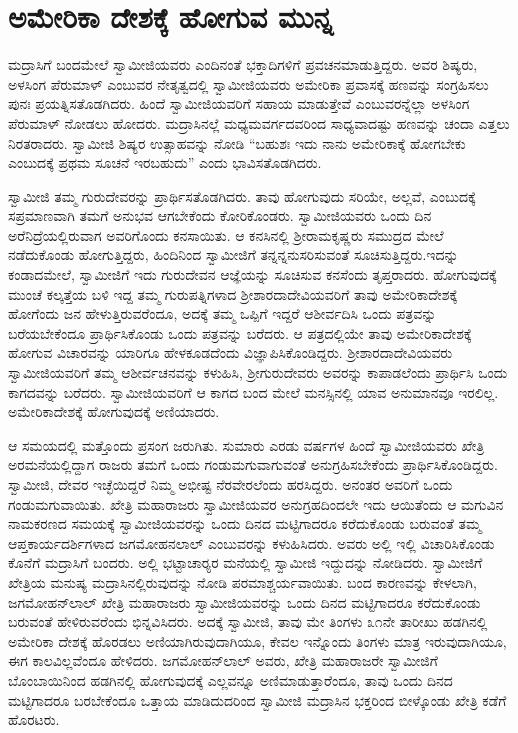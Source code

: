 
\chapter{ಅಮೇರಿಕಾ ದೇಶಕ್ಕೆ ಹೋಗುವ ಮುನ್ನ}

 ಮದ್ರಾಸಿಗೆ ಬಂದಮೇಲೆ ಸ್ವಾಮೀಜಿಯವರು ಎಂದಿನಂತೆ ಭಕ್ತಾದಿಗಳಿಗೆ ಪ್ರವಚನ\break ಮಾಡುತ್ತಿದ್ದರು. ಅವರ ಶಿಷ್ಯರು, ಅಳಸಿಂಗ ಪೆರುಮಾಳ್ ಎಂಬುವರ ನೇತೃತ್ವದಲ್ಲಿ ಸ್ವಾಮೀಜಿಯವರು ಅಮೇರಿಕಾ ಪ್ರವಾಸಕ್ಕೆ ಹಣವನ್ನು ಸಂಗ್ರಹಿಸಲು ಪುನಃ ಪ್ರಯತ್ನಿಸತೊಡಗಿದರು. ಹಿಂದೆ ಸ್ವಾಮೀಜಿಯವರಿಗೆ ಸಹಾಯ ಮಾಡುತ್ತೇವೆ ಎಂಬುವರನ್ನೆಲ್ಲಾ ಅಳಸಿಂಗ ಪೆರುಮಾಳ್ ನೋಡಲು ಹೋದರು. ಮದ್ರಾಸಿನಲ್ಲೆ ಮಧ್ಯಮವರ್ಗದವರಿಂದ ಸಾಧ್ಯವಾದಷ್ಟು ಹಣವನ್ನು ಚಂದಾ ಎತ್ತಲು ನಿರತರಾದರು. ಸ್ವಾಮೀಜಿ ಶಿಷ್ಯರ ಉತ್ಸಾಹವನ್ನು ನೋಡಿ “ಬಹುಶಃ ಇದು ನಾನು ಅಮೇರಿಕಾಕ್ಕೆ ಹೋಗಬೇಕು ಎಂಬುದಕ್ಕೆ ಪ್ರಥಮ ಸೂಚನೆ ಇರಬಹುದು” ಎಂದು ಭಾವಿಸತೊಡಗಿದರು. 

 ಸ್ವಾಮೀಜಿ ತಮ್ಮ ಗುರುದೇವರನ್ನು ಪ್ರಾರ್ಥಿಸತೊಡಗಿದರು. ತಾವು ಹೋಗುವುದು ಸರಿಯೇ, ಅಲ್ಲವೆ, ಎಂಬುದಕ್ಕೆ ಸಪ್ರಮಾಣವಾಗಿ ತಮಗೆ ಅನುಭವ ಆಗಬೇಕೆಂದು ಕೋರಿಕೊಂಡರು. ಸ್ವಾಮೀಜಿಯವರು ಒಂದು ದಿನ ಅರೆನಿದ್ರೆಯಲ್ಲಿರುವಾಗ ಅವರಿಗೊಂದು ಕನಸಾಯಿತು. ಆ ಕನಸಿನಲ್ಲಿ ಶ‍್ರೀರಾಮಕೃಷ್ಣರು ಸಮುದ್ರದ ಮೇಲೆ ನಡೆದುಕೊಂಡು ಹೋಗುತ್ತಿದ್ದರು, ಹಿಂದಿನಿಂದ ಸ್ವಾಮೀಜಿಗೆ ತನ್ನನ್ನನುಸರಿಸುವಂತೆ ಸೂಚಿಸುತ್ತಿದ್ದರು.\break ಇದನ್ನು ಕಂಡಾದಮೇಲೆ, ಸ್ವಾಮೀಜಿಗೆ ಇದು ಗುರುದೇವನ ಆಜ್ಞೆಯನ್ನು ಸೂಚಿಸುವ ಕನಸೆಂದು ತೃಪ್ತರಾದರು. ಹೋಗುವುದಕ್ಕೆ ಮುಂಚೆ ಕಲ್ಕತ್ತೆಯ ಬಳಿ ಇದ್ದ ತಮ್ಮ ಗುರುಪತ್ನಿಗಳಾದ ಶ‍್ರೀಶಾರದಾದೇವಿಯವರಿಗೆ ತಾವು ಅಮೇರಿಕಾದೇಶಕ್ಕೆ ಹೋಗೆಂದು ಜನ ಹೇಳುತ್ತಿರುವರೆಂದೂ, ಅದಕ್ಕೆ ತಮ್ಮ ಒಪ್ಪಿಗೆ ಇದ್ದರೆ ಆಶೀರ್ವದಿಸಿ ಒಂದು ಪತ್ರವನ್ನು ಬರೆಯಬೇಕೆಂದೂ ಪ್ರಾರ್ಥಿಸಿಕೊಂಡು ಒಂದು ಪತ್ರವನ್ನು ಬರೆದರು. ಆ ಪತ್ರದಲ್ಲಿಯೇ ತಾವು ಅಮೇರಿಕಾದೇಶಕ್ಕೆ ಹೋಗುವ ವಿಚಾರವನ್ನು ಯಾರಿಗೂ ಹೇಳಕೂಡದೆಂದು ವಿಜ್ಞಾಪಿಸಿಕೊಂಡಿದ್ದರು. ಶ‍್ರೀಶಾರದಾದೇವಿಯವರು ಸ್ವಾಮೀಜಿಯವರಿಗೆ ತಮ್ಮ ಆಶೀರ್ವಚನವನ್ನು ಕಳುಹಿಸಿ, ಶ‍್ರೀಗುರುದೇವರು ಅವರನ್ನು ಕಾಪಾಡಲೆಂದು ಪ್ರಾರ್ಥಿಸಿ ಒಂದು ಕಾಗದವನ್ನು ಬರೆದರು. ಸ್ವಾಮೀಜಿಯವರಿಗೆ ಆ ಕಾಗದ ಬಂದ ಮೇಲೆ ಮನಸ್ಸಿನಲ್ಲಿ ಯಾವ ಅನುಮಾನವೂ ಇರಲಿಲ್ಲ. ಅಮೇರಿಕಾದೇಶಕ್ಕೆ ಹೋಗುವುದಕ್ಕೆ ಅಣಿಯಾದರು. 

\newpage

 ಆ ಸಮಯದಲ್ಲಿ ಮತ್ತೊಂದು ಪ್ರಸಂಗ ಜರುಗಿತು. ಸುಮಾರು ಎರಡು ವರ್ಷಗಳ ಹಿಂದೆ ಸ್ವಾಮೀಜಿಯವರು ಖೇತ್ರಿ ಅರಮನೆಯಲ್ಲಿದ್ದಾಗ ರಾಜರು ತಮಗೆ ಒಂದು ಗಂಡುಮಗುವಾಗುವಂತೆ ಅನುಗ್ರಹಿಸಬೇಕೆಂದು ಪ್ರಾರ್ಥಿಸಿಕೊಂಡಿದ್ದರು. ಸ್ವಾಮೀಜಿ, ದೇವರ ಇಚ್ಛೆಯಿದ್ದರೆ ನಿಮ್ಮ ಅಭೀಷ್ಟ ನೆರವೇರಲೆಂದು ಹರಸಿದ್ದರು. ಅನಂತರ ಅವರಿಗೆ ಒಂದು ಗಂಡುಮಗುವಾಯಿತು. ಖೇತ್ರಿ ಮಹಾರಾಜರು ಸ್ವಾಮೀಜಿಯವರ ಅನುಗ್ರಹದಿಂದಲೇ ಇದು ಆಯಿತೆಂದು ಆ ಮಗುವಿನ ನಾಮಕರಣದ ಸಮಯಕ್ಕೆ ಸ್ವಾಮೀಜಿಯವರನ್ನು ಒಂದು ದಿನದ ಮಟ್ಟಿಗಾದರೂ ಕರೆದುಕೊಂಡು ಬರುವಂತೆ ತಮ್ಮ ಆಪ್ತಕಾರ್ಯದರ್ಶಿಗಳಾದ ಜಗಮೋಹನಲಾಲ್ ಎಂಬುವರನ್ನು ಕಳುಹಿಸಿದರು. ಅವರು ಅಲ್ಲಿ ಇಲ್ಲಿ ವಿಚಾರಿಸಿಕೊಂಡು ಕೊನೆಗೆ ಮದ್ರಾಸಿಗೆ ಬಂದರು. ಅಲ್ಲಿ ಭಟ್ಟಾಚಾರ‍್ಯರ ಮನೆಯಲ್ಲಿ ಸ್ವಾಮೀಜಿ ಇದ್ದುದನ್ನು ನೋಡಿದರು. ಸ್ವಾಮೀಜಿಗೆ ಖೇತ್ರಿಯ ಮನುಷ್ಯ ಮದ್ರಾಸಿನಲ್ಲಿರುವುದನ್ನು ನೋಡಿ ಪರಮಾಶ್ಚರ್ಯವಾಯಿತು. ಬಂದ ಕಾರಣವನ್ನು ಕೇಳಲಾಗಿ, ಜಗಮೋಹನ್‍ಲಾಲ್ ಖೇತ್ರಿ ಮಹಾರಾಜರು ಸ್ವಾಮೀಜಿಯವರನ್ನು ಒಂದು ದಿನದ ಮಟ್ಟಿಗಾದರೂ ಕರೆದುಕೊಂಡು ಬರುವಂತೆ ಹೇಳಿರುವರೆಂದು ಭಿನ್ನವಿಸಿದರು. ಅದಕ್ಕೆ ಸ್ವಾಮೀಜಿ, ತಾವು ಮೇ ತಿಂಗಳು ೩೧ನೇ ತಾರೀಖು ಹಡಗಿನಲ್ಲಿ ಅಮೇರಿಕಾ ದೇಶಕ್ಕೆ ಹೊರಡಲು ಅಣಿಯಾಗಿರುವುದಾಗಿಯೂ, ಕೇವಲ ಇನ್ನೊಂದು ತಿಂಗಳು ಮಾತ್ರ ಇರುವುದಾಗಿಯೂ, ಈಗ ಕಾಲವಿಲ್ಲವೆಂದೂ ಹೇಳಿದರು. ಜಗಮೋಹನ್‍ಲಾಲ್ ಅವರು, ಖೇತ್ರಿ ಮಹಾರಾಜರೇ ಸ್ವಾಮೀಜಿಗೆ ಬೊಂಬಾಯಿನಿಂದ ಹಡಗಿನಲ್ಲಿ ಹೋಗುವುದಕ್ಕೆ ಎಲ್ಲವನ್ನೂ ಅಣಿಮಾಡುತ್ತಾರೆಂದೂ, ತಾವು ಒಂದು ದಿನದ ಮಟ್ಟಿಗಾದರೂ ಬರಬೇಕೆಂದೂ ಒತ್ತಾಯ ಮಾಡಿದುದರಿಂದ ಸ್ವಾಮೀಜಿ ಮದ್ರಾಸಿನ ಭಕ್ತರಿಂದ ಬೀಳ್ಕೊಂಡು ಖೇತ್ರಿ ಕಡೆಗೆ ಹೊರಟರು. 

